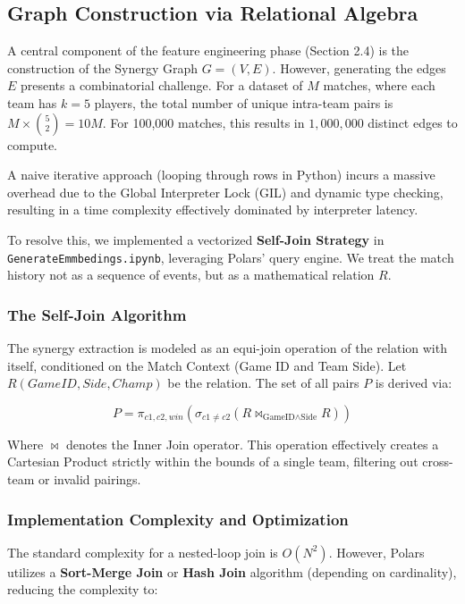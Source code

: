 \documentclass[12pt, a4paper]{article}
\begin{document}
    \subsection{Graph Construction via Relational Algebra}

    A central component of the feature engineering phase (Section 2.4) is the construction of the Synergy Graph $G=(V, E)$. However, generating the edges $E$ presents a combinatorial challenge. For a dataset of $M$ matches, where each team has $k=5$ players, the total number of unique intra-team pairs is $M \times \binom{5}{2} = 10M$. For 100,000 matches, this results in $1,000,000$ distinct edges to compute.

    A naive iterative approach (looping through rows in Python) incurs a massive overhead due to the Global Interpreter Lock (GIL) and dynamic type checking, resulting in a time complexity effectively dominated by interpreter latency.

    To resolve this, we implemented a vectorized \textbf{Self-Join Strategy} in \texttt{GenerateEmmbedings.ipynb}, leveraging Polars' query engine. We treat the match history not as a sequence of events, but as a mathematical relation $R$.

    \subsubsection{The Self-Join Algorithm}
    The synergy extraction is modeled as an equi-join operation of the relation with itself, conditioned on the Match Context (Game ID and Team Side). Let $R(GameID, Side, Champ)$ be the relation. The set of all pairs $P$ is derived via:

    \begin{equation}
        P = \pi_{c1, c2, win} ( \sigma_{c1 \neq c2} ( R \bowtie_{\text{GameID} \land \text{Side}} R ) )
    \end{equation}

    Where $\bowtie$ denotes the Inner Join operator. This operation effectively creates a Cartesian Product strictly within the bounds of a single team, filtering out cross-team or invalid pairings.

    \subsubsection{Implementation Complexity and Optimization}
    The standard complexity for a nested-loop join is $O(N^2)$. However, Polars utilizes a \textbf{Sort-Merge Join} or \textbf{Hash Join} algorithm (depending on cardinality), reducing the complexity to:
\end{document}
